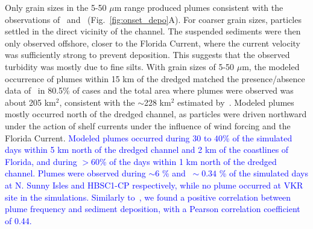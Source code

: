 \documentclass[preprint,12pt,authoryear]{elsarticle}
\newcommand{\modif}[1]{\textcolor{blue}{#1}}
\begin{document}
Only grain sizes in the 5-50 $\mu$m range produced plumes consistent with the observations of~\cite{barnes2015sediment} and~\cite{cunning2019extensive} (Fig.~\ref{fig:onset_depo}A). For coarser grain sizes, particles settled in the direct vicinity of the channel. The suspended sediments were then only observed offshore, closer to the Florida Current, where the current velocity was sufficiently strong to prevent deposition. This suggests that the observed turbidity was mostly due to fine silts. With grain sizes of 5-50 $\mu$m, the modeled occurrence of plumes  within 15 km of the dredged matched the presence/absence data of~\cite{cunning2019extensive} in 80.5\% of cases and the total area where plumes were observed was about 205 km$^2$, consistent with the $\sim$228 km$^2$ estimated by~\cite{barnes2015sediment}. Modeled plumes mostly occurred north of the dredged channel, as particles were driven northward under the action of shelf currents under the influence of wind forcing and the Florida Current. \modif{Modeled plumes occurred during $30$ to $40$\% of the simulated days within 5 km north of the dredged channel and 2 km of the coastlines of Florida, and during $> 60$\% of the days within 1 km north of the dredged channel. Plumes were observed during  $\sim6$ \% and $~\sim0.34$ \% of the simulated days at N. Sunny Isles and HBSC1-CP respectively, while no plume occurred at VKR site in the simulations. Similarly to~\cite{cunning2019extensive}, we found a positive correlation between plume frequency and sediment deposition, with a Pearson correlation coefficient of 0.44.}

\end{document}
